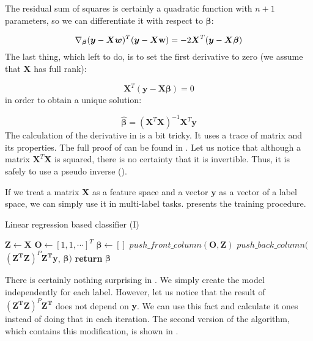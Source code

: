 The residual sum of squares is certainly a quadratic function with $n+1$ parameters, so we can differentiate it with respect to $\boldsymbol{\beta}$:

\begin{equation}\label{eq:LR4}
    \nabla_{\boldsymbol{\beta}} (\boldsymbol{y}-\boldsymbol{X}\boldsymbol{w})^T(\boldsymbol{y}-\boldsymbol{X}\bold{w}) = -2\boldsymbol{X}^T(\boldsymbol{y}-\boldsymbol{X}\boldsymbol{\beta})
\end{equation}
The last thing, which left to do, is to set the first derivative to zero (we assume that $\boldsymbol{X}$ has full rank):

\begin{equation}\label{eq:LR4}
    \boldsymbol{X}^T(\boldsymbol{y}-\boldsymbol{X}\boldsymbol{\beta}) = 0
\end{equation}
in order to obtain a unique solution:

\begin{equation}\label{eq:LR5}
    \boldsymbol{\hat{\beta}} = (\boldsymbol{X}^T\boldsymbol{X})^{-1}\boldsymbol{X}^T\boldsymbol{y}
\end{equation}
The calculation of the derivative in  is a bit tricky. It uses a trace of matrix and its properties. The full proof of  can be found in . Let us notice that although a matrix $\boldsymbol{X}^T\boldsymbol{X}$ is squared, there is no certainty that it is invertible. Thus, it is safely to use a pseudo inverse (\cite{Trevor}).

If we treat a matrix $\boldsymbol{X}$ as a feature space and a vector $\boldsymbol{y}$ as a vector of a label space, we can simply use it in multi-label tasks.  presents the training procedure.

\begin{algorithm}
    \caption{Linear regression based classifier (I)}\label{alg:LR0}
    \begin{algorithmic}[1]
        \State $\boldsymbol{Z} \gets \boldsymbol{X}$ 
        \State $\boldsymbol{O} \gets [1, 1, \cdots]^T$ 
        \State $\boldsymbol{\beta} \gets []$
        \State $push\_front\_column(\boldsymbol{O}, \boldsymbol{Z})$
            \State $push\_back\_column($ $(\boldsymbol{Z^T}\boldsymbol{Z})^P\boldsymbol{Z^T}\boldsymbol{y}$, $\boldsymbol{\beta})$ 
        \EndFor
        \State \textbf{return} $\boldsymbol{\beta}$
    \EndFunction
    \end{algorithmic}
\end{algorithm}
There is certainly nothing surprising in . We simply create the model independently for each label. However, let us notice that the result of $(\boldsymbol{Z^T}\boldsymbol{Z})^P\boldsymbol{Z^T}$ does not depend on $\boldsymbol{y}$. We can use this fact and calculate it ones instead of doing that in each iteration. The second version of the algorithm, which contains this modification, is shown in . 


